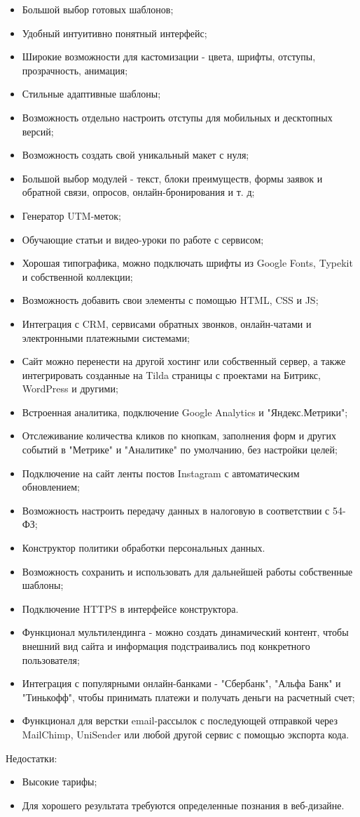 \begin{itemize}
	\item	Большой выбор готовых шаблонов;
	\item	Удобный интуитивно понятный интерфейс;
	\item	Широкие возможности для кастомизации - цвета, шрифты, отступы, прозрачность, анимация;
	\item	Стильные адаптивные шаблоны;
	\item	Возможность отдельно настроить отступы для мобильных и десктопных версий;
	\item	Возможность создать свой уникальный макет с нуля;
	\item	Большой выбор модулей - текст, блоки преимуществ, формы заявок и обратной связи, опросов, онлайн-бронирования и т. д;
	\item	Генератор UTM-меток;
	\item	Обучающие статьи и видео-уроки по работе с сервисом;
	\item	Хорошая типографика, можно подключать шрифты из Google Fonts, Typekit и собственной коллекции;
	\item	Возможность добавить свои элементы с помощью HTML, CSS и JS;
	\item	Интеграция с CRM, сервисами обратных звонков, онлайн-чатами и электронными платежными системами;
	\item	Сайт можно перенести на другой хостинг или собственный сервер, а также интегрировать созданные на Tilda страницы с проектами на Битрикс, WordPress и другими;
	\item	Встроенная аналитика, подключение Google Analytics и "Яндекс.Метрики";
	\item	Отслеживание количества кликов по кнопкам, заполнения форм и других событий в "Метрике" и "Аналитике" по умолчанию, без настройки целей;
	\item	Подключение на сайт ленты постов Instagram с автоматическим обновлением;
	\item	Возможность настроить передачу данных в налоговую в соответствии с 54-ФЗ;
	\item	Конструктор политики обработки персональных данных.
	\item	Возможность сохранить и использовать для дальнейшей работы собственные шаблоны;
	\item	Подключение HTTPS в интерфейсе конструктора.
	\item	Функционал мультилендинга - можно создать динамический контент, чтобы внешний вид сайта и информация подстраивались под конкретного пользователя;
	\item	Интеграция с популярными онлайн-банками - "Сбербанк", "Альфа Банк" и "Тинькофф", чтобы принимать платежи и получать деньги на расчетный счет;
	\item	Функционал для верстки email-рассылок с последующей отправкой через MailChimp, UniSender или любой другой сервис с помощью экспорта кода.
\end{itemize}

Недостатки:

\begin{itemize}
	\item Высокие тарифы;
	\item Для хорошего результата требуются определенные познания в веб-дизайне.
\end{itemize}



